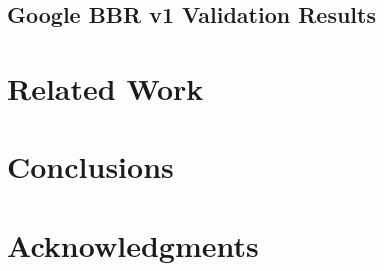 \documentclass{sig-alternate}
\begin{document}
\subsection{Google BBR v1 Validation Results}

\section{Related Work}

\section{Conclusions}

\section{Acknowledgments}
%

%
%
\end{document}
